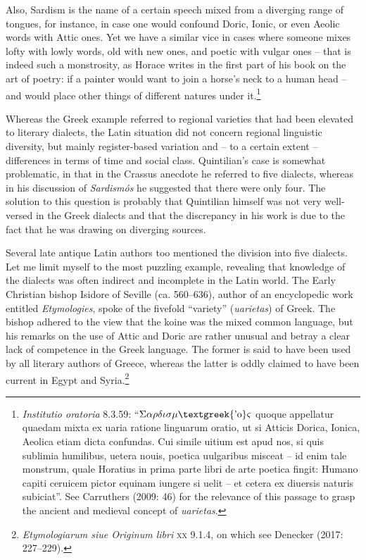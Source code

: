 \documentclass[12pt]{article}
\newenvironment{styleStandard}{\renewcommand\baselinestretch{1.25}\setlength\leftskip{0in}\setlength\rightskip{0in}\setlength\parindent{0.1972in}\setlength\parfillskip{0pt plus 1fil}\setlength\parskip{0in plus 1pt}\writerlistparindent\writerlistleftskip\leavevmode\normalfont\normalsize\writerlistlabel\ignorespaces}{\unskip\vspace{0in plus 1pt}\par}
\newenvironment{styleQuote}{\renewcommand\baselinestretch{1.25}\setlength\leftskip{0.3937in}\setlength\rightskip{0in}\setlength\parindent{0in}\setlength\parfillskip{0pt plus 1fil}\setlength\parskip{0.1665in plus 0.016649999in}\writerlistparindent\writerlistleftskip\leavevmode\normalfont\normalsize\writerlistlabel\ignorespaces}{\unskip\vspace{0.1665in plus 0.016649999in}\par}
\newcommand\writerlistleftskip{}
\newcommand\writerlistparindent{}
\newcommand\writerlistlabel{}
\begin{document}
\begin{styleQuote}
Also, Sardism\textit{ }is the name of a certain speech mixed from a diverging range of tongues, for instance, in case one would confound Doric, Ionic, or even Aeolic words with Attic ones. Yet we have a similar vice in cases where someone mixes lofty with lowly words, old with new ones, and poetic with vulgar ones – that is indeed such a monstrosity, as Horace writes in the first part of his book on the art of poetry: if a painter would want to join a horse’s neck to a human head – and would place other things of different natures under it.\footnote{\textrm{\textit{ Institutio oratoria}}\textrm{ 8.3.59: “$\Sigma \alpha \rho \delta \iota \sigma \mu \text{\textgreek{'o}}\varsigma $ quoque appellatur quaedam mixta ex uaria ratione linguarum oratio, ut si Atticis Dorica, Ionica, Aeolica etiam dicta confundas. Cui simile uitium est apud nos, si quis sublimia humilibus, uetera nouis, poetica uulgaribus misceat – id enim tale monstrum, quale Horatius in prima parte libri de arte poetica fingit: Humano capiti ceruicem pictor equinam iungere si uelit – et cetera ex diuersis naturis subiciat”. See Carruthers (2009: 46) for the relevance of this passage to grasp the ancient and medieval concept of }\textrm{\textit{uarietas}}\textrm{.}}
\end{styleQuote}

\begin{styleStandard}
Whereas the Greek example referred to regional varieties that had been elevated to literary dialects, the Latin situation did not concern regional linguistic diversity, but mainly register-based variation and – to a certain extent – differences in terms of time and social class. Quintilian’s case is somewhat problematic, in that in the Crassus anecdote he referred to five dialects, whereas in his discussion of \textit{Sardismós} he suggested that there were only four. The solution to this question is probably that Quintilian himself was not very well-versed in the Greek dialects and that the discrepancy in his work is due to the fact that he was drawing on diverging sources.
\end{styleStandard}

\begin{styleStandard}
Several late antique Latin authors too mentioned the division into five dialects. Let me limit myself to the most puzzling example, revealing that knowledge of the dialects was often indirect and incomplete in the Latin world. The Early Christian bishop Isidore of Seville (ca. 560–636), author of an encyclopedic work entitled \textit{Etymologies}, spoke of the fivefold “variety” (\textit{uarietas}) of Greek. The bishop adhered to the view that the koine was the mixed common language, but his remarks on the use of Attic and Doric are rather unusual and betray a clear lack of competence in the Greek language. The former is said to have been used by all literary authors of Greece, whereas the latter is oddly claimed to have been current in Egypt and Syria.\footnote{ \textit{Etymologiarum siue Originum libri }\textsc{xx}\textit{ }9.1.4, on which see Denecker (2017: 227–229).}
\end{styleStandard}
\end{document}
